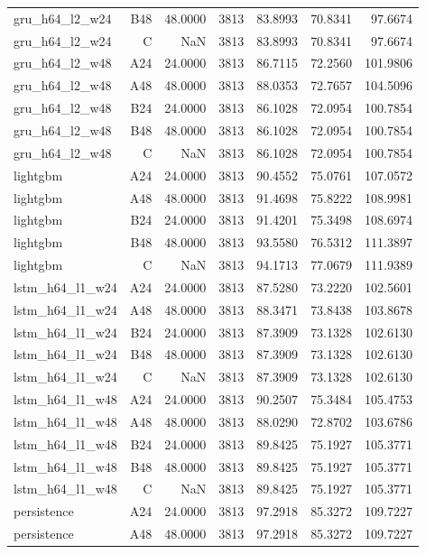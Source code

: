 \begin{table}[htbp]
\begin{tabular}{lrrrrrr}
gru\_h64\_l2\_w24 & B48 & 48.0000 & 3813 & 83.8993 & 70.8341 & 97.6674 \\
gru\_h64\_l2\_w24 & C & NaN & 3813 & 83.8993 & 70.8341 & 97.6674 \\
gru\_h64\_l2\_w48 & A24 & 24.0000 & 3813 & 86.7115 & 72.2560 & 101.9806 \\
gru\_h64\_l2\_w48 & A48 & 48.0000 & 3813 & 88.0353 & 72.7657 & 104.5096 \\
gru\_h64\_l2\_w48 & B24 & 24.0000 & 3813 & 86.1028 & 72.0954 & 100.7854 \\
gru\_h64\_l2\_w48 & B48 & 48.0000 & 3813 & 86.1028 & 72.0954 & 100.7854 \\
gru\_h64\_l2\_w48 & C & NaN & 3813 & 86.1028 & 72.0954 & 100.7854 \\
lightgbm & A24 & 24.0000 & 3813 & 90.4552 & 75.0761 & 107.0572 \\
lightgbm & A48 & 48.0000 & 3813 & 91.4698 & 75.8222 & 108.9981 \\
lightgbm & B24 & 24.0000 & 3813 & 91.4201 & 75.3498 & 108.6974 \\
lightgbm & B48 & 48.0000 & 3813 & 93.5580 & 76.5312 & 111.3897 \\
lightgbm & C & NaN & 3813 & 94.1713 & 77.0679 & 111.9389 \\
lstm\_h64\_l1\_w24 & A24 & 24.0000 & 3813 & 87.5280 & 73.2220 & 102.5601 \\
lstm\_h64\_l1\_w24 & A48 & 48.0000 & 3813 & 88.3471 & 73.8438 & 103.8678 \\
lstm\_h64\_l1\_w24 & B24 & 24.0000 & 3813 & 87.3909 & 73.1328 & 102.6130 \\
lstm\_h64\_l1\_w24 & B48 & 48.0000 & 3813 & 87.3909 & 73.1328 & 102.6130 \\
lstm\_h64\_l1\_w24 & C & NaN & 3813 & 87.3909 & 73.1328 & 102.6130 \\
lstm\_h64\_l1\_w48 & A24 & 24.0000 & 3813 & 90.2507 & 75.3484 & 105.4753 \\
lstm\_h64\_l1\_w48 & A48 & 48.0000 & 3813 & 88.0290 & 72.8702 & 103.6786 \\
lstm\_h64\_l1\_w48 & B24 & 24.0000 & 3813 & 89.8425 & 75.1927 & 105.3771 \\
lstm\_h64\_l1\_w48 & B48 & 48.0000 & 3813 & 89.8425 & 75.1927 & 105.3771 \\
lstm\_h64\_l1\_w48 & C & NaN & 3813 & 89.8425 & 75.1927 & 105.3771 \\
persistence & A24 & 24.0000 & 3813 & 97.2918 & 85.3272 & 109.7227 \\
persistence & A48 & 48.0000 & 3813 & 97.2918 & 85.3272 & 109.7227 \\

\end{tabular}
\end{table}
